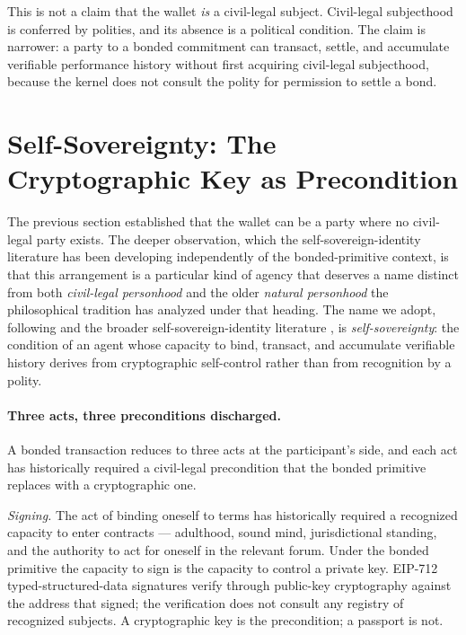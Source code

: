\documentclass[11pt,a4paper]{article}
\theoremstyle{remark}
\begin{document}
This is not a claim that the wallet \emph{is} a civil-legal
subject. Civil-legal subjecthood is conferred by polities, and
its absence is a political condition. The claim is narrower: a
party to a bonded commitment can transact, settle, and accumulate
verifiable performance history without first acquiring civil-legal
subjecthood, because the kernel does not consult the polity for
permission to settle a bond.

\section{Self-Sovereignty: The Cryptographic Key as Precondition}
\label{sec:self-sovereignty}

The previous section established that the wallet can be a party
where no civil-legal party exists. The deeper observation, which
the self-sovereign-identity literature has been developing
independently of the bonded-primitive context, is that this
arrangement is a particular kind of agency that deserves a name
distinct from both \emph{civil-legal personhood} and the older
\emph{natural personhood} the philosophical tradition has
analyzed under that heading. The name we adopt, following
\citet{allen2016path} and the broader self-sovereign-identity
literature \citep{tobin_reed_2017, w3c_did_2022}, is
\emph{self-sovereignty}: the condition of an agent whose
capacity to bind, transact, and accumulate verifiable history
derives from cryptographic self-control rather than from
recognition by a polity.

\paragraph{Three acts, three preconditions discharged.}
A bonded transaction reduces to three acts at the participant's
side, and each act has historically required a civil-legal
precondition that the bonded primitive replaces with a
cryptographic one.

\emph{Signing.} The act of binding oneself to terms has
historically required a recognized capacity to enter contracts ---
adulthood, sound mind, jurisdictional standing, and the
authority to act for oneself in the relevant forum. Under the
bonded primitive the capacity to sign is the capacity to control
a private key. EIP-712 typed-structured-data signatures verify
through public-key cryptography against the address that signed;
the verification does not consult any registry of recognized
subjects. A cryptographic key is the precondition; a passport is
not.
\end{document}

